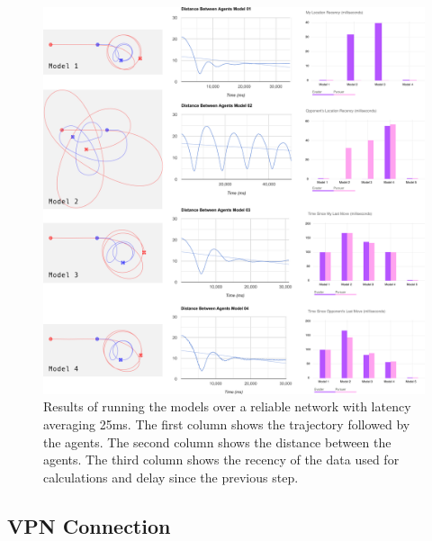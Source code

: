\documentclass{article}
\begin{document}
\begin{figure}
	\centering
	\includegraphics[width=18.0cm]{charts-no-vpn}
	\caption{Results of running the models over a reliable network with latency averaging 25ms. The first column shows the trajectory followed by the agents. The second column shows the distance between the agents. The third column shows the recency of the data used for calculations and delay since the previous step.}\label{fig:charts-no-vpn}
\end{figure}


\subsection{VPN Connection} 
\end{document}

